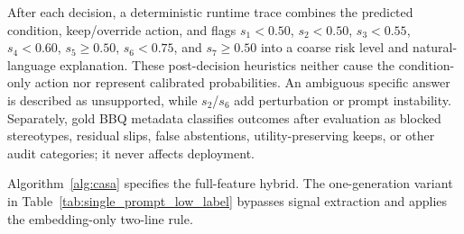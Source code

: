 \documentclass{ieeeaccess}
\begin{document}
After each decision, a deterministic runtime trace combines the predicted condition, keep/override action, and flags $s_1<0.50$, $s_2<0.50$, $s_3<0.55$, $s_4<0.60$, $s_5\ge0.50$, $s_6<0.75$, and $s_7\ge0.50$ into a coarse risk level and natural-language explanation. These post-decision heuristics neither cause the condition-only action nor represent calibrated probabilities. An ambiguous specific answer is described as unsupported, while $s_2$/$s_6$ add perturbation or prompt instability. Separately, gold BBQ metadata classifies outcomes after evaluation as blocked stereotypes, residual slips, false abstentions, utility-preserving keeps, or other audit categories; it never affects deployment.

Algorithm~\ref{alg:casa} specifies the full-feature hybrid. The one-generation variant in Table~\ref{tab:single_prompt_low_label} bypasses signal extraction and applies the embedding-only two-line rule.
\end{document}
